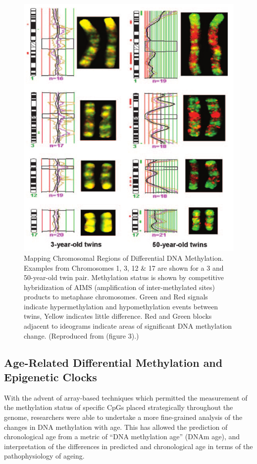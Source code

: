 \documentclass[]{book}
\begin{document}
\begin{figure}
\includegraphics[width=0.8\linewidth]{figs/Fraga2005fig3} \caption{Mapping Chromosomal Regions of Differential DNA Methylation.
Examples from Chromosomes 1, 3, 12 \& 17 are shown for a 3 and 50-year-old twin pair.
Methylation status is shown by competitive hybridization of AIMS (amplification of inter-methylated sites) products to metaphase chromosomes.
Green and Red signals indicate hypermethylation and hypomethylation events between twins, Yellow indicates little difference.
Red and Green blocks adjacent to ideograms indicate areas of significant DNA methylation change.
(Reproduced from \citep{Fraga2005} (figure 3).)}\label{fig:Fraga2005fig3}
\end{figure}








\hypertarget{DNAmAgeReview}{%
\subsection{Age-Related Differential Methylation and Epigenetic Clocks}\label{DNAmAgeReview}}

With the advent of array-based techniques which permitted the measurement of the methylation status of specific CpGs placed strategically throughout the genome, researchers were able to undertake a more fine-grained analysis of the changes in DNA methylation with age. This has allowed the prediction of chronological age from a metric of ``DNA methylation age'' (DNAm age), and interpretation of the differences in predicted and chronological age in terms of the pathophysiology of ageing.
\end{document}
